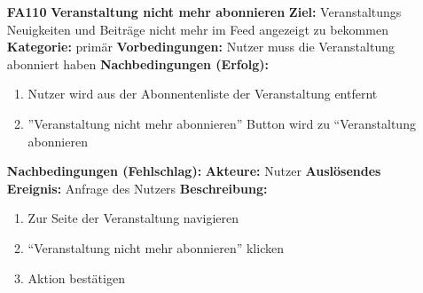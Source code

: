 \documentclass[parskip=full]{scrartcl}
\begin{document}
\begin{itemize}[nosep]
		\item[\textbf{FA110}]\textbf{Veranstaltung nicht mehr abonnieren}
		\newline \textbf{Ziel:} Veranstaltungs Neuigkeiten und Beiträge nicht mehr im Feed angezeigt zu bekommen
		\newline \textbf{Kategorie:} primär
		\newline \textbf{Vorbedingungen:} Nutzer muss die Veranstaltung abonniert haben
		\newline \textbf{Nachbedingungen (Erfolg):}
		\begin{enumerate}[nosep]
			\item Nutzer wird aus der Abonnentenliste der Veranstaltung entfernt
			\item ”Veranstaltung nicht mehr abonnieren” Button wird zu “Veranstaltung abonnieren
		\end{enumerate}
		\textbf{Nachbedingungen (Fehlschlag):}
		\newline \textbf{Akteure:} Nutzer
		\newline \textbf{Auslösendes Ereignis:} Anfrage des Nutzers
		\newline\newline \textbf{Beschreibung:}
		\begin{enumerate}[nosep]
			\item Zur Seite der Veranstaltung navigieren
			\item “Veranstaltung nicht mehr abonnieren” klicken
			\item  Aktion bestätigen\\
		\end{enumerate}



\end{itemize}
\end{document}
